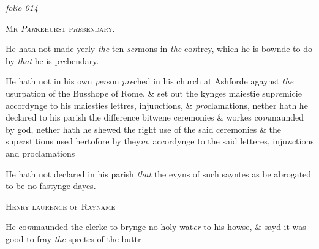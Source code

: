 \documentclass[12pt, a4paper]{book}
\begin{document}
\textit{folio 014}


            
            	
				\begin{center} \begin{large} {\scshape Mr\textit{ Par}kehurst p\textit{re}bendary.} \end{large} \end{center}
			

 
		\ifthenelse{\isodd{\thepage}}
		{\reversemarginpar}
		{\normalmarginpar}
		He hath not made yerly \textit{the} ten \textit{ser}mons in \textit{the} co\textit{n}trey,
 which he is bownde to do by \textit{that} he is p\textit{re}bendary.
 
				\marginpar[\vspace{0.5cm}{\textcolor{Gray}{the busshope of Rome}}]{}
			
		\ifthenelse{\isodd{\thepage}}
		{\reversemarginpar}
		{\normalmarginpar}
		He hath not in his own \textit{per}son \textit{pre}ched in his church
 	at Ashforde agaynst \textit{the} usurpation of the Busshope of
 Rome, \& set out the kynges maiestie sup\textit{re}micie accordynge
 to his maiesties lettres, inju\textit{n}ctions, \& \textit{pro}clamations, nether
 hath he declared to his parish the difference bitwene
 ceremonies \& workes co\textit{m}maunded by god, nether hath
 he shewed the right use of the said ceremonies \&
 the sup\textit{er}stitions used hertofore by they\textit{m}, accordynge to
 the said letteres, inju\textit{n}ctions and proclamations

				\marginpar[\vspace{0.5cm}{\textcolor{Gray}{proclamations}}]{}
			
		\ifthenelse{\isodd{\thepage}}
		{\reversemarginpar}
		{\normalmarginpar}
		He hath not declared in his parish \textit{that} the evyns of
 such sayntes as be abrogated to be no fastynge dayes.
 

            
            	
				\begin{center} \begin{large} {\scshape Henry laurence of Rayname} \end{large} \end{center}
			


				\marginpar[\vspace{0.5cm}{\textcolor{Gray}{ceremonies}}]{}
			
		\ifthenelse{\isodd{\thepage}}
		{\reversemarginpar}
		{\normalmarginpar}
		He co\textit{m}maunded the clerke to brynge no holy wat\textit{er} to his
 howse, \& sayd it was good to fray \textit{the} spretes of the buttr
 
\end{document}
